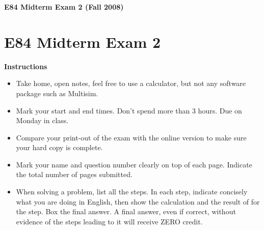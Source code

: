 \usepackage{html}

\begin{center}
{\Large \bf  E84 Midterm Exam 2 (Fall 2008)}
\end{center}

\section*{E84 Midterm Exam 2}

{\bf Instructions}
\begin{itemize}
\item Take home, open notes, feel free to use a calculator, but not any software 
  package such as Multisim. 
\item Mark your start and end times. Don't spend more than 3 hours. Due on 
  Monday in class.
\item Compare your print-out of the exam with the online version to make
  sure your hard copy is complete.
\item Mark your name and question number clearly on top of each page.
  Indicate the total number of pages submitted.
\item When solving a problem, list all the steps. In each step, indicate
  concisely what you are doing in English, then show the calculation 
  and the result of for the step. Box the final answer.
  A final answer, even if correct, without evidence of the steps leading
  to it will receive ZERO credit.
\end{itemize}

